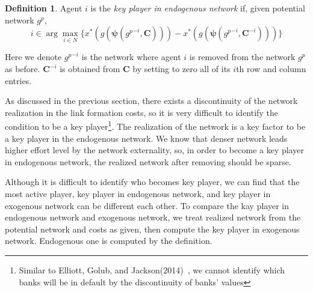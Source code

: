 \documentclass[12pt]{article}
\theoremstyle{definition}
\newtheorem{definition}{Definition}
\newcommand{\bm}[1]{\boldsymbol{#1}}
\begin{document}
\begin{definition}
Agent $i$ is the {\it{key player in endogenous network}} if, given potential network $g^p$,
\[ i \in \arg \max_{i \in N} \{ x^*(g(\bm{\psi}({g^p}^{-i}, \bm{C}))) - x^*(g(\bm{\psi}({g^p}^{-i}, \bm{C}^{-i}))) \} \]
\end{definition}
Here we denote ${g^p}^{-i}$ is the network where agent $i$ is removed from the network $g^p$ as before.
$\bm{C}^{-i}$ is obtained from $\bm{C}$ by setting to zero all of its $i$th row and column entries.

As discussed in the previous section, there exists a discontinuity of the network realization in the link formation costs, so it is very difficult to identify the condition to be a key player\footnote{Similar to Elliott, Golub, and Jackson(2014)~\cite{contagion}, we cannot identify which banks will be in default by the discontinuity of banks' values}.
The realization of the network is a key factor to be a key player in the endogenous network.
We know that denser network leads higher effort level by the network externality, so, in order to become a key player in endogenous network, the realized network after removing should be sparse.

Although it is difficult to identify who becomes key player, we can find that the most active player, key player in endogenous network, and key player in exogenous network can be different each other.
To compare the kay player in endogenous network and exogenous network, we treat realized network from the potential network and costs as given, then compute the key player in exogenous network.
Endogenous one is computed by the definition.
\end{document}
